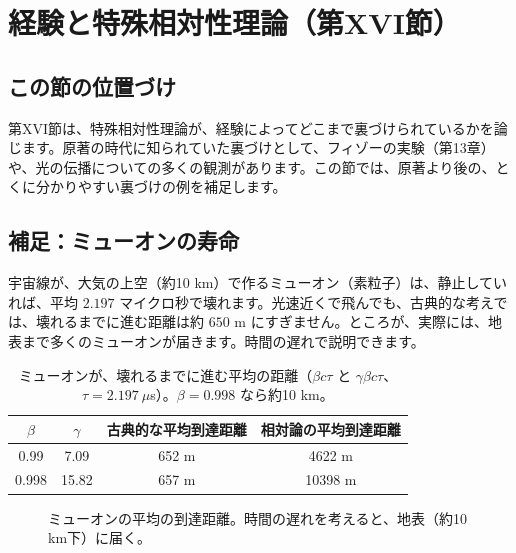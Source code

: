 \documentclass[a4paper,11pt,openany]{ltjsbook}
\begin{document}
\chapter{経験と特殊相対性理論（第XVI節）}

\section{この節の位置づけ}

第XVI節は、特殊相対性理論が、経験によってどこまで裏づけられているかを論じます。原著の時代に知られていた裏づけとして、フィゾーの実験（第13章）や、光の伝播についての多くの観測があります。この節では、原著より後の、とくに分かりやすい裏づけの例を補足します。

\section{補足：ミューオンの寿命}

宇宙線が、大気の上空（約10 km）で作るミューオン（素粒子）は、静止していれば、平均 $2.197$ マイクロ秒で壊れます。光速近くで飛んでも、古典的な考えでは、壊れるまでに進む距離は約 $650$ m にすぎません。ところが、実際には、地表まで多くのミューオンが届きます。時間の遅れで説明できます。

\begin{table}[htbp]
\centering
\begin{tabular}{c|ccc}
\toprule
$\beta$ & $\gamma$ & 古典的な平均到達距離 & 相対論の平均到達距離\\
\midrule
0.99 & 7.09 & 652 m & 4622 m\\
0.998 & 15.82 & 657 m & 10398 m\\
\bottomrule
\end{tabular}
\caption{ミューオンが、壊れるまでに進む平均の距離（$\beta c\tau$ と $\gamma\beta c\tau$、$\tau=2.197\ \mu$s）。$\beta=0.998$ なら約10 km。}
\end{table}

\begin{figure}[htbp]
\centering
{}
\caption{ミューオンの平均の到達距離。時間の遅れを考えると、地表（約10 km下）に届く。}
\end{figure}
\end{document}
